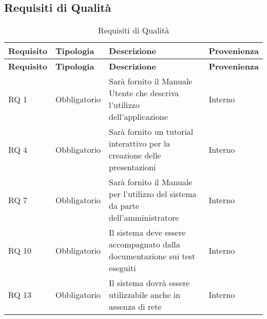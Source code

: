 \subsection{Requisiti di Qualità}{ 
\renewcommand*{\arraystretch}{1.4} 
\begin{longtable} [c]{| p{2.5cm} | p{2.5cm} | p{6cm} |p{2.5cm}|} 
\caption{Requisiti di Qualità \label{tab:reqQualita}}\\ \hline\textbf{Requisito} & \textbf{Tipologia} & \textbf{Descrizione} & \textbf{Provenienza} \\ 
\hline \endfirsthead \hline 
\textbf{Requisito} & \textbf{Tipologia} & \textbf{Descrizione} & \textbf{Provenienza} \\ 
\hline \endhead \hline \endfoot \hline \endlastfoot 
RQ 1 & Obbligatorio & Sarà fornito il Manuale Utente che descriva l'utilizzo dell'applicazione & Interno\\ 
 \hline 
RQ 4 & Obbligatorio & Sarà fornito un tutorial interattivo per la creazione delle presentazioni & Interno\\ 
 \hline 
RQ 7 & Obbligatorio & Sarà fornito il Manuale per l'utilizzo del sistema da parte dell'amministratore & Interno\\ 
 \hline 
RQ 10 & Obbligatorio & Il sistema deve essere accompagnato dalla documentazione sui test eseguiti & Interno\\ 
 \hline 
RQ 13 & Obbligatorio & Il sistema dovrà essere utilizzabile anche in assenza di rete & Interno\\ 
 \hline 
\end{longtable}}